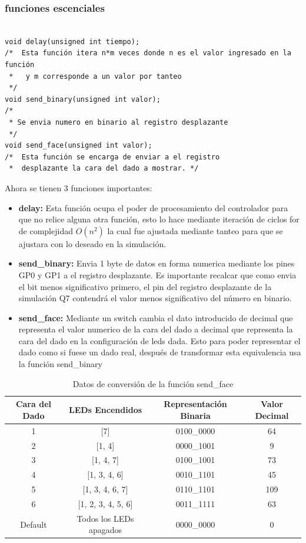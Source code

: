 \documentclass[12pt,a4paper]{article}
\begin{document}
\subsubsection{funciones escenciales}

\begin{verbatim}

void delay(unsigned int tiempo);
/*  Esta función itera n*m veces donde n es el valor ingresado en la función
 *   y m corresponde a un valor por tanteo
 */
void send_binary(unsigned int valor);
/*
 * Se envia numero en binario al registro desplazante
 */
void send_face(unsigned int valor);
/*  Esta función se encarga de enviar a el registro
 *  desplazante la cara del dado a mostrar. */
\end{verbatim}

Ahora se tienen 3 funciones importantes:

\begin{itemize}
  \item \textbf{delay:} Esta función ocupa el poder de procesamiento del controlador para que
  no relice alguna otra función, esto lo hace mediante iteración de ciclos for de complejidad $O(n^{2})$
  la cual fue ajustada mediante tanteo para que se ajustara con lo deseado en la simulación.
  \item \textbf{send\_binary:} Envia 1 byte de datos en forma numerica mediante los pines GP0 y GP1 a el registro desplazante.
  Es importante recalcar que como envia el bit menos significativo primero, el pin del registro desplazante
  de la simulación Q7 contendrá el valor menos significativo del número en binario. 
  \item \textbf{send\_face:} Mediante un switch cambia el dato introducido de decimal que representa el valor numerico
  de la cara del dado a decimal que representa la cara del dado en la configuración de leds dada.
  Esto para poder representar el dado como si fuese un dado real, después de transformar esta equivalencia
  usa la función send\_binary
\end{itemize}

\begin{table}[H]
  \centering
  \caption{Datos de conversión de la función send\_face}
  \label{tab:conversion_dado}
  \begin{tabular}{|c|c|c|c|}
    \hline
    \textbf{Cara del Dado} & \textbf{LEDs Encendidos} & \textbf{Representación Binaria} & \textbf{Valor Decimal} \\
    \hline
    1 & [7] & 0100\_0000 & 64 \\
    \hline
    2 & [1, 4] & 0000\_1001 & 9 \\
    \hline
    3 & [1, 4, 7] & 0100\_1001 & 73 \\
    \hline
    4 & [1, 3, 4, 6] & 0010\_1101 & 45 \\
    \hline
    5 & [1, 3, 4, 6, 7] & 0110\_1101 & 109 \\
    \hline
    6 & [1, 2, 3, 4, 5, 6] & 0011\_1111 & 63 \\
    \hline
    Default & Todos los LEDs apagados & 0000\_0000 & 0 \\
    \hline
  \end{tabular}
\end{table}
\end{document}
